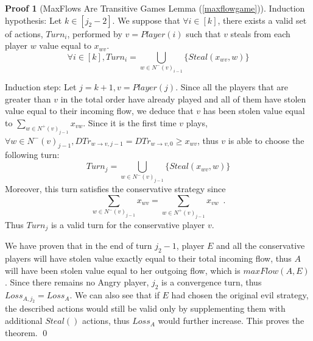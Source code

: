 \documentclass[11pt]{llncs}
\theoremstyle{definition}
\newtheorem{sepproof}{Proof}
\begin{document}
\begin{sepproof}[MaxFlows Are Transitive Games Lemma (\ref{maxflowgame})]
       Induction hypothesis: Let $k \in [j_2 - 2]$. We suppose that $\forall i \in [k]$, there exists a valid set of actions,
       $Turn_i$, performed by $v = Player\left(i\right)$ such that $v$ steals from each player $w$ value equal to $x_{wv}$.
       \begin{equation*}
          \forall i \in [k], Turn_i = \bigcup\limits_{w \in N^{-}\left(v\right)_{i-1}}\{Steal\left(x_{wv}, w\right)\}
       \end{equation*}

       Induction step: Let $j = k + 1, v = Player\left(j\right)$. Since all the players that are greater than $v$ in the
       total order have already played and all of them have stolen value equal to their incoming flow, we deduce that $v$ has
       been stolen value equal to $\sum\limits_{w \in N^{+}\left(v\right)_{j-1}}x_{vw}$. Since it is the first time $v$
       plays, $\forall w \in N^{-}\left(v\right)_{j-1}, DTr_{w \rightarrow v, j-1} = DTr_{w \rightarrow v, 0} \geq x_{wv}$, thus
       $v$ is able to choose the following turn:
       \begin{equation*}
          Turn_j = \bigcup\limits_{w \in N^{-}\left(v\right)_{j-1}}\{Steal\left(x_{wv}, w\right)\}
       \end{equation*}
       Moreover, this turn satisfies the conservative strategy since
       \begin{equation*}
          \sum\limits_{w \in N^{-}\left(v\right)_{j-1}}x_{wv} = \sum\limits_{w \in N^{+}\left(v\right)_{j-1}}x_{vw} \enspace.
       \end{equation*}
       Thus $Turn_j$ is a valid turn for the conservative player $v$.

       We have proven that in the end of turn $j_2 - 1$, player $E$ and all the conservative players will have stolen value
       exactly equal to their total incoming flow, thus $A$ will have been stolen value equal to her outgoing flow, which is
       $maxFlow(A, E)$. Since there remains no Angry player, $j_2$ is a convergence turn, thus $Loss_{A, j_2} = Loss_A$. We
       can also see that if $E$ had chosen the original evil strategy, the described actions would still be valid only by
       supplementing them with additional $Steal\left(\right)$ actions, thus $Loss_A$ would further increase. This proves the
       theorem. \qed
    \end{sepproof}
\end{document}

